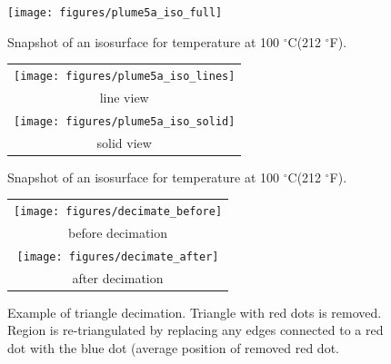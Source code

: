 \documentclass[11pt,twoside]{book}
\newcommand{\degF}{$^\circ$F}
\newcommand{\degC}{$^\circ$C}
\newcommand{\figoptions}{P}
\begin{document}
\begin{figure}[\figoptions]
\begin{center}
\texttt{[image: figures/plume5a\_iso\_full]}\\
\end{center}
\caption{Snapshot of an isosurface for temperature at 100 \degC (212 \degF).
  }
\label{figiso}%
\end{figure}

\begin{figure}[\figoptions]
\begin{center}
\begin{tabular}{c}
\texttt{[image: figures/plume5a\_iso\_lines]}\\
line view\\
\texttt{[image: figures/plume5a\_iso\_solid]}\\
solid view
\end{tabular}
\end{center}
\caption{Snapshot of an isosurface for temperature at 100 \degC (212 \degF).
  }
\label{figiso}%
\end{figure}

\begin{figure}[\figoptions]
\begin{center}
\begin{tabular}{c}
\texttt{[image: figures/decimate\_before]}\\
before decimation\\
\texttt{[image: figures/decimate\_after]}\\
after decimation
\end{tabular}
\end{center}
\caption[Example of triangle decimation.]{Example of triangle decimation.  Triangle with red dots is removed.  Region is re-triangulated by replacing any edges connected to a red dot with the blue dot (average position of removed red dot.}
\label{figdecimate}%
\end{figure}
\end{document}
